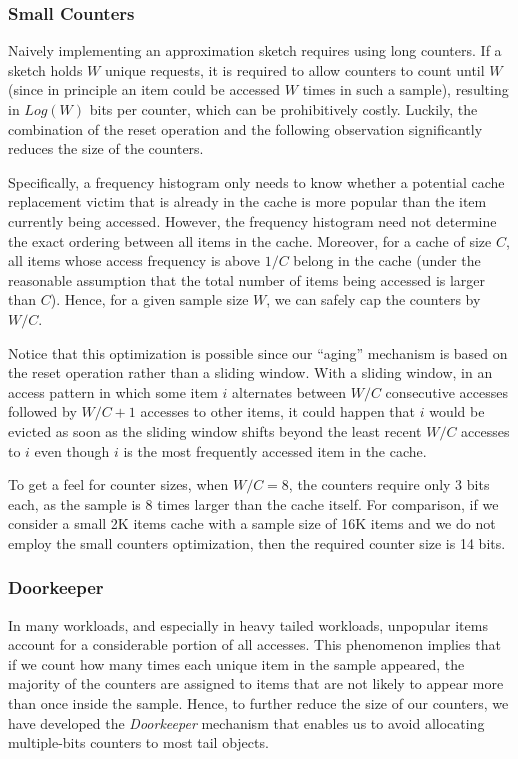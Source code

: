 \documentclass[10pt,a4paper]{article}
\begin{document}
\subsubsection{Small Counters}
Naively implementing an approximation sketch requires using long counters.
If a sketch holds $W$ unique requests, it is required to allow counters to count until $W$ (since in principle an item could
be accessed $W$ times in such a sample), resulting in $Log(W)$ bits per counter, which can be prohibitively costly.
Luckily, the combination of the reset operation and the following observation significantly reduces the size of the counters.

Specifically, a frequency histogram only needs to know whether a potential cache replacement victim that is already in the cache is more popular than the item currently being accessed. However, the frequency histogram need not determine the exact ordering
between all items in the cache.
Moreover, for a cache of size $C$, all items whose access frequency is above $1/C$ belong in the cache (under the reasonable assumption
that the total number of items being accessed is larger than $C$). Hence, for a given sample size $W$, we can safely cap the counters by $W/C$.

Notice that this optimization is possible since our ``aging'' mechanism is based on the reset operation rather than a sliding window.
With a sliding window, in an access pattern in which some item $i$ alternates between $W/C$ consecutive accesses followed by $W/C+1$ accesses to other items, it could happen that $i$ would be evicted as soon as the sliding window shifts beyond the least recent $W/C$ accesses to $i$ even though $i$ is the most frequently accessed item in the cache.

To get a feel for counter sizes, when $W/C=8$, the counters require only 3 bits each, as the sample is 8 times larger than the cache itself.
For comparison, if we consider a small 2K items cache with a sample size of 16K items and we do not employ the small counters optimization, then the required counter size is 14 bits.



\subsubsection{Doorkeeper}

In many workloads, and especially in heavy tailed workloads, unpopular items account for a considerable portion of all accesses.
This phenomenon implies that if we count how many times each unique item in the sample appeared, the majority of the counters are assigned to items that are not likely to appear more than once inside the sample.
Hence, to further reduce the size of our counters, we have developed the \emph{Doorkeeper} mechanism that enables us to avoid allocating multiple-bits
counters to most tail objects.
\end{document}
